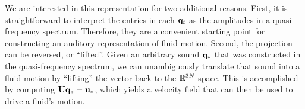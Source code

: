 \documentclass[11pt]{article}
\begin{document}
We are interested in this representation for two additional reasons. First, it is straightforward to interpret the entries in each $\mathbf{q}_t$ as the amplitudes in a quasi-frequency spectrum. Therefore, they are a convenient starting point for constructing an auditory representation of fluid motion. Second, the projection can be reversed, or ``lifted''. Given an arbitrary sound $\mathbf{q}_*$ that was constructed in the quasi-frequency spectrum, we can unambiguously translate that sound into a fluid motion by ``lifting'' the vector back to the $\mathbb{R}^{3N}$ space. This is accomplished by computing $\mathbf{U} \mathbf{q}_* = \mathbf{u}_*$, which yields a velocity field that can then be used to drive a fluid's motion.

%
%    
\end{document}
